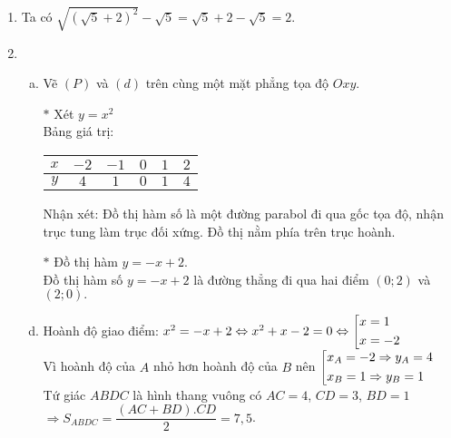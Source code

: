 \begin{ex}
\loigiai
    {
\begin{enumerate}[1)]
\item Ta có $\sqrt{\left(\sqrt{5}+2\right)^2}-\sqrt{5}=\sqrt{5}+2-\sqrt{5}=2$.
\item 
\hfill
\begin{enumerate}[a)]
\item Vẽ $\left(P\right)$ và $\left(d\right)$ trên cùng một mặt phẳng tọa độ $Oxy$.
\item[$\ast$] Xét $y=x^2$\\
Bảng giá trị: \begin{center}
			\begin{tabular}{|c|c|c|c|c|c|}
				\hline
			$x$&$-2$&$-1$&$0$&$1$&$2$\\
			\hline
			$y$&$4$&$1$&$0$&$1$&$4$\\
			\hline
					\end{tabular}
				\end{center}
\noindent Nhận xét: Đồ thị hàm số là một đường parabol đi qua gốc tọa độ, nhận trục tung làm trục đối xứng. Đồ thị nằm phía trên trục hoành.
		\item[$\ast$] Đồ thị hàm $y=-x+2.$	\\
		Đồ thị hàm số $y=-x+2$ là đường thẳng đi qua hai điểm $(0;2)$ và $(2;0).$
\item Hoành độ giao điểm: $x^2=-x+2 \Leftrightarrow x^2+x-2=0 \Leftrightarrow \left[\begin{aligned}&x=1\\&x=-2\end{aligned}\right.$\\
Vì hoành độ của $A$ nhỏ hơn hoành độ của $B$ nên $\left[\begin{aligned}&x_A=-2 \Rightarrow y_A=4\\&x_B=1 \Rightarrow y_B=1\end{aligned}\right.$\\
Tứ giác $ABDC$ là hình thang vuông có $AC=4$, $CD=3$, $BD=1$ \\
$\Rightarrow S_{ABDC}=\dfrac{\left(AC+BD\right).CD}{2}=7,5$.
\end{enumerate}
\end{enumerate}

\begin{center}


\end{center}}
\end{ex}
